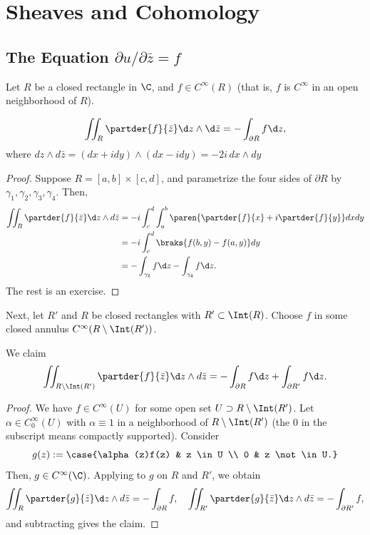 \documentclass[11pt]{report}
\begin{document}
\chapter{Sheaves and Cohomology}

\section{\texorpdfstring{The Equation $\partial u/\partial \bar z=f$}{The Equation du/dzbar = f}}

Let $R$ be a closed rectangle in $\C$, and $f \in C^{\infty}(R)$ (that is, $f$ is $C^\infty$ in an open neighborhood of $R$).

\begin{prop}[][label=prop:sortastokes]
    $$\iint_R\partder{f}{\bar z}\d z\land \d \bar z = -\int_{\partial R}f \d z,$$
    where $d z \land d \bar z = (dx+idy)\land (dx - idy)=-2i\,dx \land dy$
\end{prop}

\begin{proof}
    Suppose $R=[a,b]\times [c,d]$, and parametrize the four sides of $\partial R$ by $\gamma_1,\gamma_2,\gamma_3,\gamma_4$. Then,
    \begin{align*}
        \iint_R \partder{f}{\bar z}\d z \land d \bar z &=-i \int_{c}^d\int_a^b\paren{\partder{f}{x}+i\partder{f}{y}}dxdy
        \\ &= -i\int_c^d \braks{f(b,y)-f(a,y)}dy
        \\ &=-\int_{\gamma_2}f\d z -\int_{\gamma_4}f\d z.
    \end{align*}
    The rest is an exercise.
\end{proof}

Next, let $R'$ and $R$ be closed rectangles with $R' \subset \Int(R)$. Choose $f$ in some closed annulus $C^\infty (R\setminus \Int(R'))$.
\begin{claim}
    We claim
    $$\iint_{R\setminus \Int(R')}\partder{f}{\bar z}\d z \land d\bar z = -\int_{\partial R}f\d z + \int_{\partial R'}f\d z.$$
\end{claim}
\begin{proof}
    We have $f \in C^\infty (U)$ for some open set $U \supset R\setminus \Int (R')$. Let $\alpha \in C^\infty _0(U)$ with $\alpha \equiv 1$ in a neighborhood of $R\setminus \Int(R')$ (the $0$ in the subscript means compactly supported). Consider
    $$g(z) :=\case{\alpha(z)f(z) & z \in U \\ 0 & z \not \in U.}$$
    Then, $g \in C^\infty (\C)$. Applying  to $g$ on $R$ and $R'$, we obtain
    $$\iint_R \partder{g}{\bar z}\d z \land d\bar z = -\int_{\partial R}f, \quad \iint_{R'}\partder{g}{\bar z}\d z \land d\bar z=-\int_{\partial R'}f,$$
    and subtracting gives the claim.
\end{proof}
\end{document}

